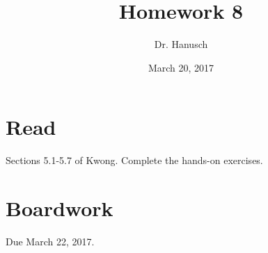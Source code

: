 \documentclass[12pt]{article}
\title{Homework 8}
\author{Dr. Hanusch}  %
\date{March 20, 2017}
\begin{document}
\newtheorem{thm}{Theorem}[section]
\newtheorem{cor}[thm]{Corollary}
\newtheorem{lem}[thm]{Lemma}
\newtheorem{prop}[thm]{Proposition}
\theoremstyle{definition}
\newtheorem{defn}[thm]{Definition}
\newtheorem{qu}[]{Question}
\theoremstyle{remark}
\newtheorem{rem}[thm]{Remark}
\newtheorem*{prf}{Proof}

\newcommand{\norm}[1]{\left\Vert#1\right\Vert}
\newcommand{\abs}[1]{\left\vert#1\right\vert}
\newcommand{\set}[1]{\left\{#1\right\}}
\newcommand{\Real}{\mathbb R}
\newcommand{\Zee}{\mathbb Z}
\newcommand{\eps}{\varepsilon}
\newcommand{\To}{\longrightarrow}
\newcommand{\BX}{\mathbf{B}(X)}
\newcommand{\A}{\mathcal{A}}
\newcommand{\U}{\mathcal{U}}
\newcommand{\power}{\mathscr{P}}
\newcommand{\dv}{\textrm{ div }}




\maketitle

\section{Read}

Sections 5.1-5.7 of Kwong. Complete the hands-on exercises.

\section{Boardwork} 

Due March 22, 2017.

\end{document}
